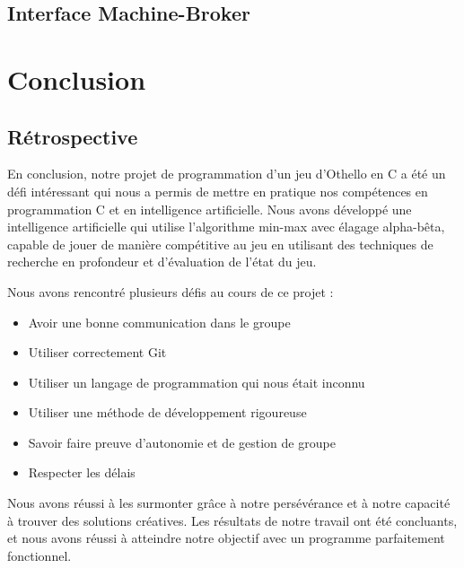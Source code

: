 \documentclass{article}
\begin{document}
\subsection{Interface Machine-Broker}                                                                                                                                                                    
                                                                                                                                                
                                                            
\newpage

\section{Conclusion}
\subsection{Rétrospective}

En conclusion, notre projet de programmation d'un jeu d'Othello en C a été un défi intéressant qui nous a permis de mettre en pratique nos compétences en programmation C et en intelligence artificielle. Nous avons développé une intelligence artificielle qui utilise l'algorithme min-max avec élagage alpha-bêta, capable de jouer de manière compétitive au jeu en utilisant des techniques de recherche en profondeur et d'évaluation de l'état du jeu.

\vspace{5mm}

Nous avons rencontré plusieurs défis au cours de ce projet :
\begin{itemize}
\item Avoir une bonne communication dans le groupe
\item Utiliser correctement Git
\item Utiliser un langage de programmation qui nous était inconnu
\item Utiliser une méthode de développement rigoureuse
\item Savoir faire preuve d'autonomie et de gestion de groupe
\item Respecter les délais
\end{itemize}

\vspace{5mm}

Nous avons réussi à les surmonter grâce à notre persévérance et à notre capacité à trouver des solutions créatives. Les résultats de notre travail ont été concluants, et nous avons réussi à atteindre notre objectif avec un programme parfaitement fonctionnel.
\end{document}

